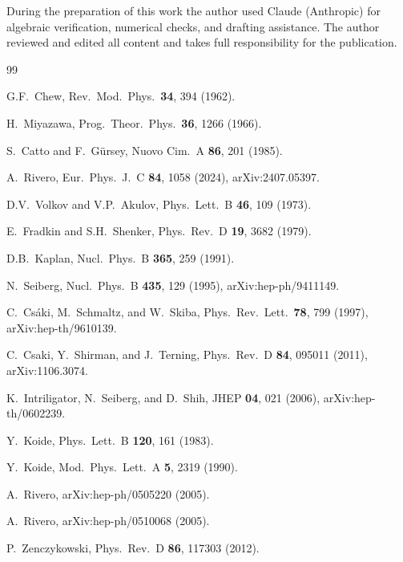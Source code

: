 \documentclass[12pt,a4paper]{article}
\begin{document}
During the preparation of this work the author used Claude
(Anthropic) for algebraic verification, numerical checks,
and drafting assistance.
The author reviewed and edited all content and takes full
responsibility for the publication.


\begin{thebibliography}{99}

  G.F.~Chew,
  Rev.\ Mod.\ Phys.\ \textbf{34}, 394 (1962).

  H.~Miyazawa,
  Prog.\ Theor.\ Phys.\ \textbf{36}, 1266 (1966).

  S.~Catto and F.~G\"ursey,
  Nuovo Cim.\ A \textbf{86}, 201 (1985).

  A.~Rivero,
  Eur.\ Phys.\ J.\ C \textbf{84}, 1058 (2024),
  arXiv:2407.05397.

  D.V.~Volkov and V.P.~Akulov,
  Phys.\ Lett.\ B \textbf{46}, 109 (1973).

  E.~Fradkin and S.H.~Shenker,
  Phys.\ Rev.\ D \textbf{19}, 3682 (1979).

  D.B.~Kaplan,
  Nucl.\ Phys.\ B \textbf{365}, 259 (1991).

  N.~Seiberg,
  Nucl.\ Phys.\ B \textbf{435}, 129 (1995),
  arXiv:hep-ph/9411149.

  C.~Cs\'aki, M.~Schmaltz, and W.~Skiba,
  Phys.\ Rev.\ Lett.\ \textbf{78}, 799 (1997),
  arXiv:hep-th/9610139.

  C.~Csaki, Y.~Shirman, and J.~Terning,
  Phys.\ Rev.\ D \textbf{84}, 095011 (2011),
  arXiv:1106.3074.

  K.~Intriligator, N.~Seiberg, and D.~Shih,
  JHEP \textbf{04}, 021 (2006),
  arXiv:hep-th/0602239.

  Y.~Koide,
  Phys.\ Lett.\ B \textbf{120}, 161 (1983).

  Y.~Koide,
  Mod.\ Phys.\ Lett.\ A \textbf{5}, 2319 (1990).

  A.~Rivero,
  arXiv:hep-ph/0505220 (2005).

  A.~Rivero,
  arXiv:hep-ph/0510068 (2005).

  P.~Zenczykowski,
  Phys.\ Rev.\ D \textbf{86}, 117303 (2012).


\end{thebibliography}
\end{document}
